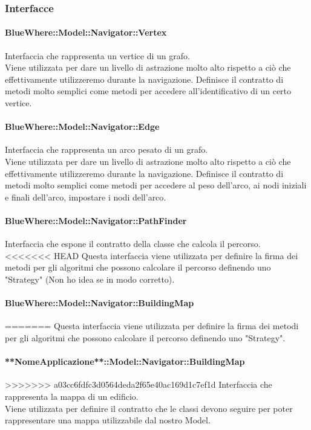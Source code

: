 \documentclass[../SpecificaTecnica.tex]{subfiles}
\begin{document}
			\subsubsection{Interfacce}
				\paragraph{BlueWhere::Model::Navigator::Vertex}
					Interfaccia che rappresenta un vertice di un grafo. \\ 
					Viene utilizzata per dare un livello di astrazione molto alto rispetto a ciò che effettivamente utilizzeremo durante la navigazione. Definisce il contratto di metodi molto semplici come metodi per accedere all'identificativo di un certo vertice.
				\paragraph{BlueWhere::Model::Navigator::Edge}
					Interfaccia che rappresenta un arco pesato di un grafo. \\ 
					Viene utilizzata per dare un livello di astrazione molto alto rispetto a ciò che effettivamente utilizzeremo durante la navigazione. Definisce il contratto di metodi molto semplici come metodi per accedere al peso dell'arco, ai nodi iniziali e finali dell'arco, impostare i nodi dell'arco.
				\paragraph{BlueWhere::Model::Navigator::PathFinder}
					Interfaccia che espone il contratto della classe che calcola il percorso. \\ 
<<<<<<< HEAD
					Questa interfaccia viene utilizzata per definire la firma dei metodi per gli algoritmi che possono calcolare il percorso definendo uno "Strategy" (Non ho idea se in modo corretto).
				\paragraph{BlueWhere::Model::Navigator::BuildingMap}
=======
					Questa interfaccia viene utilizzata per definire la firma dei metodi per gli algoritmi che possono calcolare il percorso definendo uno "Strategy".
				\paragraph{**NomeApplicazione**::Model::Navigator::BuildingMap}
>>>>>>> a03cc6fdfc3d0564deda2f65e40ac169d1c7ef1d
					Interfaccia che rappresenta la mappa di un edificio. \\
					Viene utilizzata per definire il contratto che le classi devono seguire per poter rappresentare una mappa utilizzabile dal nostro Model.
\end{document}
